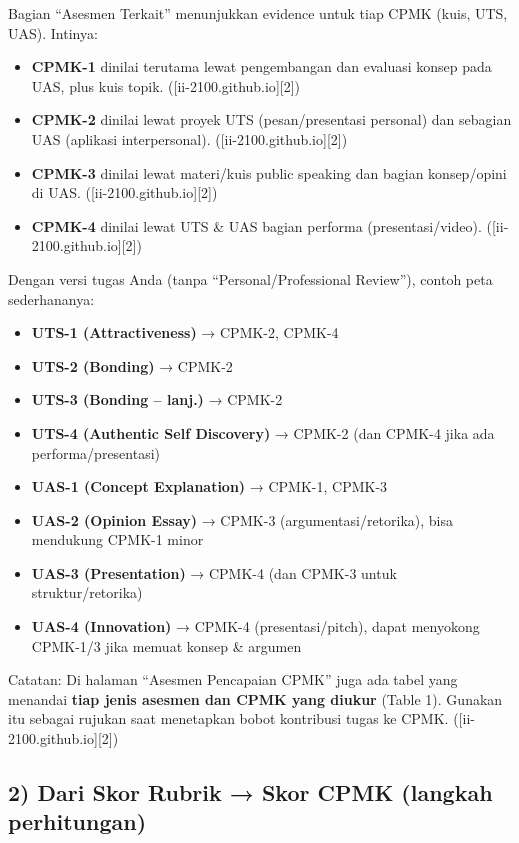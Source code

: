 \documentclass[
  letterpaper,
  DIV=11,
  numbers=noendperiod]{scrreprt}
\providecommand{\tightlist}{%
  \setlength{\itemsep}{0pt}\setlength{\parskip}{0pt}}
\begin{document}
Bagian ``Asesmen Terkait'' menunjukkan evidence untuk tiap CPMK (kuis,
UTS, UAS). Intinya:

\begin{itemize}
\tightlist
\item
  \textbf{CPMK-1} dinilai terutama lewat pengembangan dan evaluasi
  konsep pada UAS, plus kuis topik. ({[}ii-2100.github.io{]}{[}2{]})
\item
  \textbf{CPMK-2} dinilai lewat proyek UTS (pesan/presentasi personal)
  dan sebagian UAS (aplikasi interpersonal).
  ({[}ii-2100.github.io{]}{[}2{]})
\item
  \textbf{CPMK-3} dinilai lewat materi/kuis public speaking dan bagian
  konsep/opini di UAS. ({[}ii-2100.github.io{]}{[}2{]})
\item
  \textbf{CPMK-4} dinilai lewat UTS \& UAS bagian performa
  (presentasi/video). ({[}ii-2100.github.io{]}{[}2{]})
\end{itemize}

Dengan versi tugas Anda (tanpa ``Personal/Professional Review''), contoh
peta sederhananya:

\begin{itemize}
\tightlist
\item
  \textbf{UTS-1 (Attractiveness)} → CPMK-2, CPMK-4
\item
  \textbf{UTS-2 (Bonding)} → CPMK-2
\item
  \textbf{UTS-3 (Bonding -- lanj.)} → CPMK-2
\item
  \textbf{UTS-4 (Authentic Self Discovery)} → CPMK-2 (dan CPMK-4 jika
  ada performa/presentasi)
\item
  \textbf{UAS-1 (Concept Explanation)} → CPMK-1, CPMK-3
\item
  \textbf{UAS-2 (Opinion Essay)} → CPMK-3 (argumentasi/retorika), bisa
  mendukung CPMK-1 minor
\item
  \textbf{UAS-3 (Presentation)} → CPMK-4 (dan CPMK-3 untuk
  struktur/retorika)
\item
  \textbf{UAS-4 (Innovation)} → CPMK-4 (presentasi/pitch), dapat
  menyokong CPMK-1/3 jika memuat konsep \& argumen
\end{itemize}

Catatan: Di halaman ``Asesmen Pencapaian CPMK'' juga ada tabel yang
menandai \textbf{tiap jenis asesmen dan CPMK yang diukur} (Table 1).
Gunakan itu sebagai rujukan saat menetapkan bobot kontribusi tugas ke
CPMK. ({[}ii-2100.github.io{]}{[}2{]})

\subsection*{2) Dari Skor Rubrik → Skor CPMK (langkah
perhitungan)}\label{dari-skor-rubrik-skor-cpmk-langkah-perhitungan}
\end{document}
